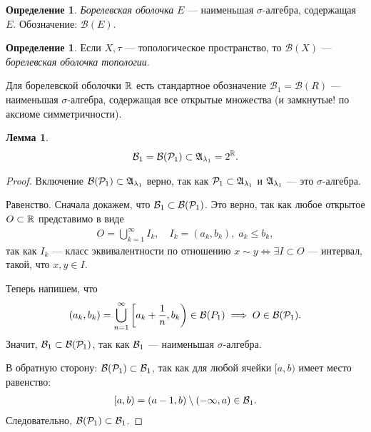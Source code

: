 \documentclass[a4paper,14pt]{extarticle}
\newcounter{theoremCnt}
\theoremstyle{definition}
\newtheorem{df}[theoremCnt]{Определение}
\theoremstyle{plain}
\theoremstyle{plain}
\newtheorem{lm}[theoremCnt]{Лемма}
\theoremstyle{plain}
\theoremstyle{plain}
\theoremstyle{definition}
\theoremstyle{definition}
\theoremstyle{definition}
\theoremstyle{definition}
\theoremstyle{definition}
\theoremstyle{definition}
\theoremstyle{plain}
\theoremstyle{plain}
\theoremstyle{plain}
\theoremstyle{plain}
\theoremstyle{definition}
\theoremstyle{definition}
\theoremstyle{definition}
\theoremstyle{definition}
\theoremstyle{definition}
\newcommand{\R}{\ensuremath \mathbb{R}}
\newcommand{\A}{\ensuremath \mathfrak{A}}
\newcommand{\p}{\ensuremath \mathcal{P}}
\begin{document}
\begin{df}
 \textit{Борелевская оболочка} $E$ --- наименьшая $\sigma$-алгебра, содержащая $E$. Обозначение: $\mathcal{B}(E)$.
\end{df}
\begin{df}
 Если $X, \tau$ --- топологическое пространство, то $\mathcal{B}(X)$ --- \textit{борелевская оболочка топологии}.

 Для борелевской оболочки $\R$ есть стандартное обозначение $\mathcal{B}_1 = \mathcal{B}(R)$ --- наименьшая $\sigma$-алгебра, содержащая все открытые множества (и замкнутые! по аксиоме симметричности).
\end{df}
\newcommand{\B}{\ensuremath \mathcal{B}}
\begin{lm}
 \begin{align*}
  \B_1 = \B( \p_1 ) \subset \A_{\lambda_1} = 2^{\R}
 .\end{align*}
\end{lm}
\begin{proof}
 Включение $\B(\p_1) \subset \A_{\lambda_1}$ верно, так как $\p_1 \subset \A_{\lambda_1}$ и $\A_{\lambda_1}$ --- это $\sigma$-алгебра.

 Равенство. Сначала докажем, что $\B_1 \subset \B(\p_1)$. Это верно, так как любое открытое $O \subset \R$ представимо в виде
 \begin{align*}
  O = \bigcup_{k=1}^{\infty} I_k, \quad I_k = (a_k, b_k),\; a_k \leqslant b_k
 ,\end{align*} так как $I_k$ --- класс эквивалентности по отношению $x \sim y \iff \exists I \subset O $ --- интервал, такой, что $x, y \in I$.

 Теперь напишем, что
 \begin{align*}
  (a_k, b_k) = \bigcup_{n=1}^{\infty} \left[a_k + \frac{1}{n}, b_k\right) \in \B(P_1) \implies O \in \B(\p_1)
 .\end{align*} Значит, $\B_1 \subset \B(\p_1)$, так как $\B_1$ --- наименьшая $\sigma$-алгебра.

 В обратную сторону: $\B(\p_1) \subset \B_1$, так как для любой ячейки $[a, b)$ имеет место равенство:
 \begin{align*}
  [a, b) = (a - 1, b) \setminus (-\infty, a) \in \B_1
 .\end{align*} Следовательно, $\B(\p_1) \subset \B_1$.
\end{proof}
\end{document}

